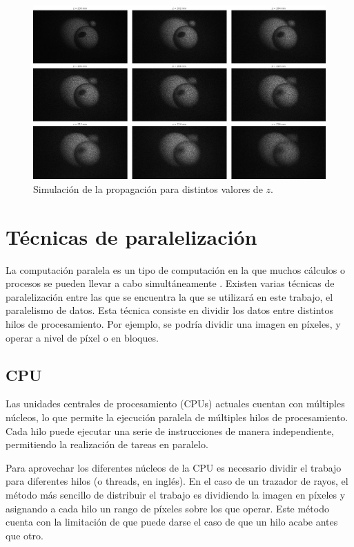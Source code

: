 \documentclass[10pt, a4paper]{article}
\begin{document}
\begin{figure}[H]
    \centering
    \includegraphics[width=1\textwidth]{reconstruction-figure}
    \caption{Simulación de la propagación para distintos valores de $z$.}
    \label{fig:reconstruccion-figura}
\end{figure}

\section{Técnicas de paralelización}

La computación paralela es un tipo de computación en la que muchos cálculos o procesos se pueden llevar a cabo simultáneamente \cite{Almasi:1989}. Existen varias técnicas de paralelización entre las que se encuentra la que se utilizará en este trabajo, el paralelismo de datos. Esta técnica consiste en dividir los datos entre distintos hilos de procesamiento. Por ejemplo, se podría dividir una imagen en píxeles, y operar a nivel de píxel o en bloques.

\subsection{CPU}

Las unidades centrales de procesamiento (CPUs) actuales cuentan con múltiples núcleos, lo que permite la ejecución paralela de múltiples hilos de procesamiento. Cada hilo puede ejecutar una serie de instrucciones de manera independiente, permitiendo la realización de tareas en paralelo.

Para aprovechar los diferentes núcleos de la CPU es necesario dividir el trabajo para diferentes hilos (o threads, en inglés). En el caso de un trazador de rayos, el método más sencillo de distribuir el trabajo es dividiendo la imagen en píxeles y asignando a cada hilo un rango de píxeles sobre los que operar. Este método cuenta con la limitación de que puede darse el caso de que un hilo acabe antes que otro. 
\end{document}
